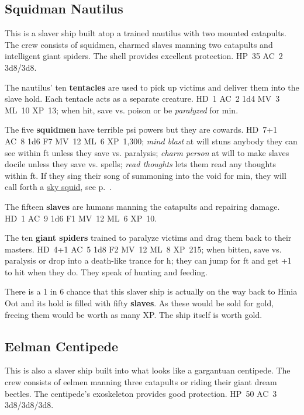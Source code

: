 \documentclass[a4paper,serif]{rpg-module}
\begin{document}
\subsection{Squidman Nautilus}
\label{sec:squidman-nautilus}

This is a slaver ship built atop a trained nautilus with two mounted
catapults. The crew consists of squidmen, charmed slaves manning two
catapults and intelligent giant spiders. The shell provides excellent
protection. HP~35 AC~2 3d8/3d8.

The nautilus' ten \textbf{tentacles} are used to pick up victims and
deliver them into the slave hold. Each tentacle acts as a separate
creature. HD~1 AC~2 1d4 MV~3 ML~10 XP~13; when hit, save vs. poison or
be \textit{paralyzed} for \unit[10]{min}.

The five \textbf{squidmen} have terrible psi powers but they are
cowards. HD~7+1 AC~8 1d6 F7 MV~12 ML~6 XP~1,300; \textit{mind blast}
at will stuns anybody they can see within \unit[60]{ft} unless they
save vs. paralysis; \textit{charm person} at will to make slaves
docile unless they save vs. spells; \textit{read thoughts} lets them
read any thoughts within \unit[60]{ft}. If they sing their song of
summoning into the void for \unit[10]{min}, they will call forth a
\hyperref[sec:sky-squids]{sky squid}, see p.~\pageref{sec:sky-squids}.

The fifteen \textbf{slaves} are humans manning the catapults and
repairing damage. HD~1 AC~9 1d6 F1 MV~12 ML~6 XP~10.

The ten \textbf{giant spiders} trained to paralyze victims and drag
them back to their masters. HD~4+1 AC~5 1d8 F2 MV~12 ML~8 XP~215; when
bitten, save vs. paralysis or drop into a death-like trance for
\unit[6]{h}; they can jump for \unit[20]{ft} and get +1 to hit when
they do. They speak of hunting and feeding.

There is a 1 in 6 chance that this slaver ship is actually on the way
back to Hinia Oot and its hold is filled with fifty \textbf{slaves}.
As these would be sold for \unit[25,000]{gold}, freeing them would be
worth as many XP. The ship itself is worth \unit[35,000]{gold}.

\subsection{Eelman Centipede}
\label{sec:eelman-centipede}

This is also a slaver ship built into what looks like a gargantuan
centipede. The crew consists of eelmen manning three catapults or
riding their giant dream beetles. The centipede's exoskeleton provides
good protection. HP~50 AC~3 3d8/3d8/3d8.
\end{document}
